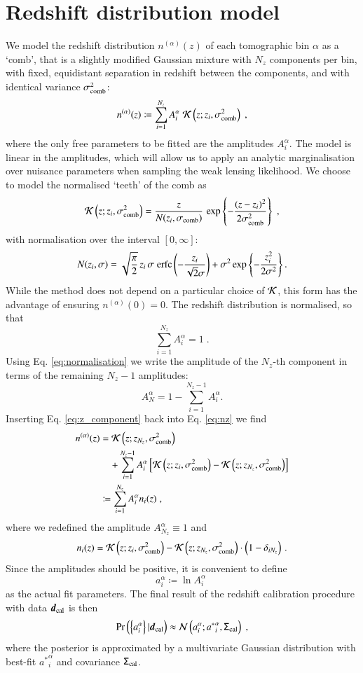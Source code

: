 \documentclass{aa}
\newcommand{\eq}[1]{\begin{equation}  #1 \end{equation}}
\newcommand{\eqa}[1]{\begin{align}   #1 \end{align}}
\newcommand{\br}[1]{\left( #1 \right)}
\newcommand{\bc}[1]{\left\{ #1 \right\}}
\newcommand{\bb}[1]{\left[ #1 \right]}
\newcommand{\nn}{\nonumber}
\newcommand{\pr}{{\rm Pr}}
\begin{document}
\section{Redshift distribution model}
\label{sec:comb}
We model the redshift distribution $n^{(\alpha)}(z)$ of each tomographic bin $\alpha$ as a `comb', that is a slightly modified Gaussian mixture with $N_z$ components per bin, with fixed, equidistant separation in redshift between the components, and with identical variance $\sigma_{\rm comb}^2$:
\eq{
\label{eq:nz}
n^{(\alpha)}(z) \coloneqq \sum_{i=1}^{N_z} A_i^\alpha\; {\cal K}\br{z; z_i, \sigma_{\rm comb}^2}\;,
}
where the only free parameters to be fitted are the amplitudes $A_i^\alpha$. The model is linear in the amplitudes, which will allow us to apply an analytic marginalisation over nuisance parameters when sampling the weak lensing likelihood. We choose to model the normalised `teeth' of the comb as
\eq{
{\cal K} \br{z; z_i, \sigma_{\rm comb}^2} = \frac{z}{N(z_i, \sigma_{\rm comb})}\, \exp \bc{- \frac{(z-z_i)^2}{2 \sigma_{\rm comb}^2} }\;, 
}
with normalisation over the interval $\bb{0,\infty}$:
\eq{
N(z_i, \sigma) = \sqrt{\frac{\pi}{2}}\, z_i\, \sigma\; {\rm erfc} \br{-\frac{z_i}{\sqrt{2} \sigma}} + \sigma^2 \exp \bc{-\frac{z_i^2}{2 \sigma^2}}.
}
While the method does not depend on a particular choice of ${\cal K}$, this form has the advantage of ensuring $n^{(\alpha)}(0)=0$. The redshift distribution is normalised, so that
\eq{
\label{eq:normalisation}
\sum_{i=1}^{N_z} A_i^\alpha = 1\;.
}
Using Eq. \eqref{eq:normalisation} we write the amplitude of the $N_z$-th component in terms of the remaining $N_z -1$ amplitudes:
\eq{
\label{eq:z_component}
A_N^\alpha = 1- \sum_{i=1}^{N_z-1} A_i^\alpha.
}
Inserting Eq. \eqref{eq:z_component} back into Eq. \eqref{eq:nz} we find
\eqa{
\label{eq:comb_nz}
n^{(\alpha)}(z) &= {\cal K}\br{z; z_{N_z}, \sigma_{\rm comb}^2} \\ \nn
& ~~~~+ \sum_{i=1}^{N_z-1} A_i^\alpha \bb{ {\cal K}\br{z; z_i, \sigma_{\rm comb}^2}  - {\cal K}\br{z; z_{N_z}, \sigma_{\rm comb}^2} } \\ 
&\coloneqq \sum_{i=1}^{N_z} A_i^\alpha n_i(z)\;,
}
where we redefined the amplitude $A_{N_z}^\alpha \equiv 1$ and
\eq{
n_i(z) ={\cal K}\br{z; z_i, \sigma_{\rm comb}^2}  - {\cal K}\br{z; z_{N_z}, \sigma_{\rm comb}^2}\cdot \left(1-\delta_{iN_z}\right)\,.
}
Since the amplitudes should be positive, it is convenient to define
\eq{
a_i^\alpha \coloneqq \ln A_i^\alpha\;
}
as the actual fit parameters. The final result of the redshift calibration procedure with data $\boldsymbol{d}_{\rm cal}$ is then
\eq{
\label{eq:posterior}
\pr \br{ \bc{a_i^\alpha} | \boldsymbol{d}_{\rm cal}} \approx {\cal N}\br{ a_i^\alpha; {a^*}_i^\alpha, \tens{\Sigma}_{\rm cal}}\;,
}
where the posterior is approximated by a multivariate Gaussian distribution with best-fit ${a^*}_i^\alpha$ and covariance $\mathsf{\Sigma}_{\rm cal}$.
\end{document}
